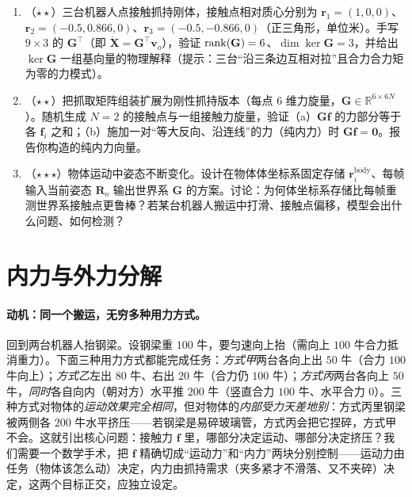 \begin{practice}
\begin{enumerate}
  \item （$\star\star$）三台机器人点接触抓持刚体，接触点相对质心分别为 $\mathbf{r}_1=(1,0,0)$、$\mathbf{r}_2=(-0.5,0.866,0)$、$\mathbf{r}_3=(-0.5,-0.866,0)$（正三角形，单位米）。手写 $9\times 3$ 的 $\mathbf{G}^\top$（即 $\dot{\mathbf{X}}=\mathbf{G}^\top\mathbf{v}_o$），验证 $\operatorname{rank}(\mathbf{G})=6$、$\dim\ker\mathbf{G}=3$，并给出 $\ker\mathbf{G}$ 一组基向量的物理解释（提示：三台“沿三条边互相对拉”且合力合力矩为零的力模式）。
  \item （$\star\star$）把抓取矩阵组装扩展为刚性抓持版本（每点 $6$ 维力旋量，$\mathbf{G}\in\mathbb{R}^{6\times 6N}$）。随机生成 $N=2$ 的接触点与一组接触力旋量，验证（a）$\mathbf{G}\mathbf{f}$ 的力部分等于各 $\mathbf{f}_i$ 之和；（b）施加一对“等大反向、沿连线”的力（纯内力）时 $\mathbf{G}\mathbf{f}=\mathbf{0}$。报告你构造的纯内力向量。
  \item （$\star\star\star$）物体运动中姿态不断变化。设计在物体体坐标系固定存储 $\mathbf{r}_i^{\text{body}}$、每帧输入当前姿态 $\mathbf{R}_o$ 输出世界系 $\mathbf{G}$ 的方案。讨论：为何体坐标系存储比每帧重测世界系接触点更鲁棒？若某台机器人搬运中打滑、接触点偏移，模型会出什么问题、如何检测？
\end{enumerate}
\end{practice}

\section{内力与外力分解}
\label{sec:cm-internal}

\paragraph{动机：同一个搬运，无穷多种用力方式。}
回到两台机器人抬钢梁。设钢梁重 $100$ 牛，要匀速向上抬（需向上 $100$ 牛合力抵消重力）。下面三种用力方式都能完成任务：\emph{方式甲}两台各向上出 $50$ 牛（合力 $100$ 牛向上）；\emph{方式乙}左出 $80$ 牛、右出 $20$ 牛（合力仍 $100$ 牛）；\emph{方式丙}两台各向上 $50$ 牛，\emph{同时}各自向内（朝对方）水平推 $200$ 牛（竖直合力 $100$ 牛、水平合力 $0$）。三种方式对物体的\emph{运动效果完全相同}，但对物体的\emph{内部受力天差地别}：方式丙里钢梁被两侧各 $200$ 牛水平挤压——若钢梁是易碎玻璃管，方式丙会把它捏碎，方式甲不会。这就引出核心问题：接触力 $\mathbf{f}$ 里，哪部分决定运动、哪部分决定挤压？我们需要一个数学手术，把 $\mathbf{f}$ 精确切成“运动力”和“内力”两块分别控制——运动力由任务（物体该怎么动）决定，内力由抓持需求（夹多紧才不滑落、又不夹碎）决定，这两个目标正交，应独立设定。

